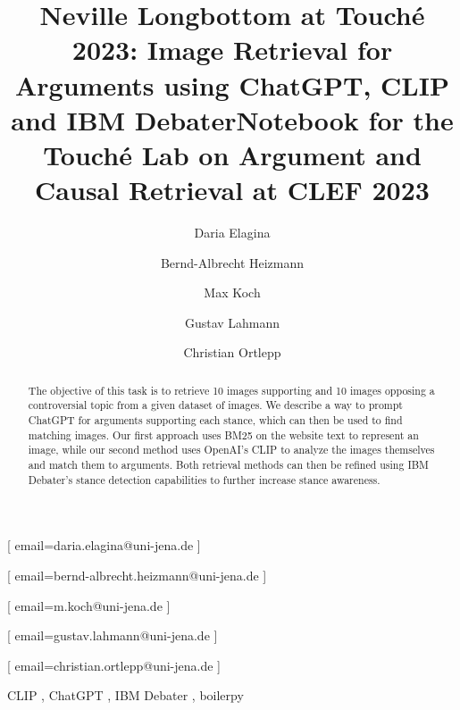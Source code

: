 \documentclass[
]{ceurart}
\begin{document}


\title{Neville Longbottom at Touch\'e 2023: Image Retrieval for Arguments using ChatGPT, CLIP and IBM Debater}
\title[mode=sub]{Notebook for the Touch{\'e} Lab on Argument and Causal Retrieval at CLEF 2023}


\author[1]{Daria Elagina}[%
email=daria.elagina@uni-jena.de
]
\author[1]{Bernd-Albrecht Heizmann}[%
email=bernd-albrecht.heizmann@uni-jena.de
]
\author[1]{Max Koch}[%
email=m.koch@uni-jena.de
]
\author[1]{Gustav Lahmann}[%
email=gustav.lahmann@uni-jena.de
]
\author[1]{Christian Ortlepp}[%
email=christian.ortlepp@uni-jena.de
]


\address[1]{Friedrich-Schiller University Jena,
07743, Jena}


\begin{abstract}
The objective of this task is to retrieve 10 images supporting and 10 images opposing a controversial topic from a given dataset of images. We describe a way to prompt ChatGPT for arguments supporting each stance, which can then be used to find matching images. Our first approach uses BM25 on the website text to represent an image, while our second method uses OpenAI's CLIP to analyze the images themselves and match them to arguments. Both retrieval methods can then be refined using IBM Debater's stance detection capabilities to further increase stance awareness.
\end{abstract}

\begin{keywords}
  CLIP \sep
  ChatGPT \sep
  IBM Debater \sep
	boilerpy
\end{keywords}

\maketitle
\end{document}
